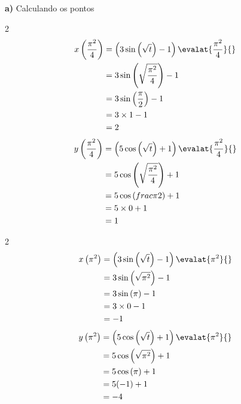 \documentclass[a4paper,12pt,fleqn]{article}
\begin{document}
\begin{answer}
\textbf{a)} \quad
Calculando os pontos
\begin{multicols}{2}
\begin{align*}
  x\left(\frac{\pi^2}{4}\right)
  & = \left(3 \sin\left(\sqrt{t}\right) - 1\right) \evalat{\frac{\pi^2}{4}}{} \\
  & = 3 \sin\left(\sqrt{\frac{\pi^2}{4}}\right) - 1  \\
  & = 3 \sin\left(\frac{\pi}{2}\right) - 1  \\
  & = 3 \times 1 - 1  \\
  & = 2
\end{align*}
\newcolumn
\begin{align*}
  y\left(\frac{\pi^2}{4}\right)
  & = \left(5 \cos\left(\sqrt{t}\right) + 1\right) \evalat{\frac{\pi^2}{4}}{} \\
  & = 5 \cos\left(\sqrt{\frac{\pi^2}{4}}\right) + 1 \\
  & = 5 \cos\left(frac{\pi}{2}\right) + 1 \\
  & = 5 \times 0 + 1 \\
  & = 1
\end{align*}
\end{multicols}

\newpage
\begin{multicols}{2}
\begin{align*}
  x\left(\pi^2\right)
  & = \left(3 \sin\left(\sqrt{t}\right) - 1\right) \evalat{\pi^2}{} \\
  & = 3 \sin\left(\sqrt{\pi^2}\right) - 1  \\
  & = 3 \sin\left(\pi\right) - 1  \\
  & = 3 \times 0 - 1  \\
  & = -1
\end{align*}
\newcolumn
\begin{align*}
  y\left(\pi^2\right)
  & = \left(5 \cos\left(\sqrt{t}\right) + 1\right) \evalat{\pi^2}{} \\
  & = 5 \cos\left(\sqrt{\pi^2}\right) + 1 \\
  & = 5 \cos\left(\pi\right) + 1 \\
  & = 5 (-1) + 1 \\
  & = -4
\end{align*}
\end{multicols}


\end{answer}
\end{document}
